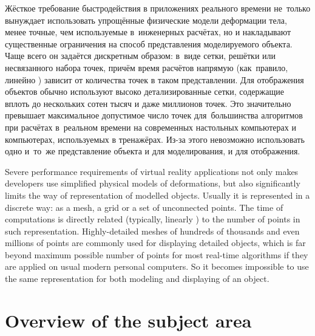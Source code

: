 \documentclass[a4paper, 12pt, titlepage]{extarticle}
\begin{document}
\begin{original}
    Жёсткое требование быстродействия в приложениях реального времени не~только вынуждает
    использовать упрощённые физические модели деформации тела, менее точные, чем используемые
    в~инженерных расчётах, но и накладывают существенные ограничения на способ представления
    моделируемого объекта. Чаще всего он задаётся дискретным образом: в~виде сетки, решётки или
    несвязанного набора точек, причём время расчётов напрямую (как~правило, линейно
    \cite{mueller-meshless}) зависит от количества точек в таком представлении. Для отображения
    объектов обычно используют высоко детализированные сетки, содержащие вплоть до нескольких
    сотен тысяч и даже миллионов точек. Это значительно превышает максимальное допустимое число точек для~большинства
    алгоритмов \cite{mueller-stable, mueller-meshless, chang-crash} при расчётах в~реальном времени на
    современных настольных компьютерах и компьютерах, используемых в тренажёрах. Из-за этого
    невозможно использовать одно и~то~же представление объекта и для моделирования, и для
    отображения.
\end{original}

    Severe performance requirements of virtual reality applications not only makes developers use
    simplified physical models of deformations, but also significantly limits the way of
    representation of modelled objects. Usually it is represented in a discrete way: as a mesh, a
    grid or a set of unconnected points. The time of computations is directly related (typically,
    linearly \cite{mueller-meshless}) to the number of points in such representation.
    Highly-detailed meshes of hundreds of thousands and even millions of points are commonly used
    for displaying detailed objects, which is far beyond maximum possible number of points for most
    real-time algorithms \cite{mueller-stable, mueller-meshless, chang-crash} if they are applied on
    usual modern personal computers. So it becomes impossible to use the same representation for
    both modeling and displaying of an object.


  \section{Overview of the subject area}\label{sec:domain}
\end{document}
